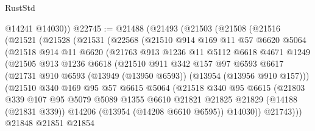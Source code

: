 \begin{lexlean}{RustStd}
\begin{coremodule}
        @14241
        @14030))
@22745 := @21488
    (@21493
      (@21503
        (@21508
          (@21516
            (@21521
              (@21528
                (@21531
                  (@22568
                    (@21510
                      @914
                      @169
                      @11
                      @57
                      @6620
                      @5064
                      (@21518
                        @914
                        @11
                        @6620
                        (@21763
                          @913
                          @1236
                          @11
                          @5112
                          @6618
                          @4671
                          @1249
                          (@21505
                            @913
                            @1236
                            @6618
                            (@21510
                              @911
                              @342
                              @157
                              @97
                              @6593
                              @6617
                              (@21731
                                @910
                                @6593
                                (@13949 (@13950 @6593))
                                (@13954 (@13956 @910 @157)))
                              (@21510
                                @340
                                @169
                                @95
                                @57
                                @6615
                                @5064
                                (@21518
                                  @340
                                  @95
                                  @6615
                                  (@21803
                                    @339
                                    @107
                                    @95
                                    @5079
                                    @5089
                                    @1355
                                    @6610
                                    @21821
                                    @21825
                                    @21829
                                    (@14188 (@21831 @339))
                                    @14206
                                    (@13954 (@14208 @6610 @6595))
                                    @14030))
                                @21743)))
                          @21848
                          @21851
                          @21854

\end{coremodule}
\end{lexlean}

